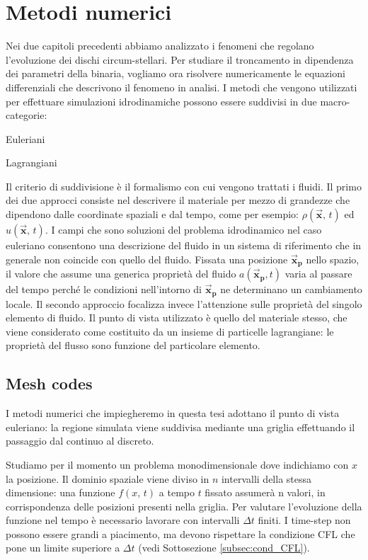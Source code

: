 \chapter{Metodi numerici}
Nei due capitoli precedenti abbiamo analizzato i fenomeni che regolano l'evoluzione dei dischi circum-stellari.
Per studiare il troncamento in dipendenza dei parametri della binaria, vogliamo ora risolvere numericamente le equazioni differenziali che descrivono il fenomeno in analisi. 
I metodi che vengono utilizzati per effettuare simulazioni idrodinamiche possono essere suddivisi in due macro-categorie:
\begin{list}{\textbf{-}}{\setlength{\itemsep}{0cm}}
    \item Euleriani
    \item Lagrangiani
\end{list}
Il criterio di suddivisione è il formalismo con cui vengono trattati i fluidi.
Il primo dei due approcci consiste nel descrivere il materiale per mezzo di grandezze che dipendono dalle coordinate spaziali e dal tempo, come per esempio: $\rho\left(\Vec{\textbf{x}},\,t\right)$ ed $u\left(\Vec{\textbf{x}},\,t\right)$.
I campi che sono soluzioni del problema idrodinamico nel caso euleriano consentono una descrizione del fluido in un sistema di riferimento che in generale non coincide con quello del fluido. Fissata una posizione $\Vec{\textbf{x}}_\textbf{p}$ nello spazio, il valore che assume una generica proprietà del fluido $a\left(\Vec{\textbf{x}}_\textbf{p}, t\right)$ varia al passare del tempo perché le condizioni nell'intorno di $\Vec{\textbf{x}}_\textbf{p}$ ne determinano un cambiamento locale. 
Il secondo approccio focalizza invece l'attenzione sulle proprietà del singolo elemento di fluido. Il punto di vista utilizzato è quello del materiale stesso, che viene considerato come costituito da un insieme di particelle lagrangiane: le proprietà del flusso sono funzione del particolare elemento.

\section{Mesh codes}

I metodi numerici che impiegheremo in questa tesi adottano il punto di vista euleriano: la regione simulata viene suddivisa mediante una griglia effettuando il passaggio dal continuo al discreto.

Studiamo per il momento un problema monodimensionale dove indichiamo con $x$ la posizione. Il dominio spaziale viene diviso in $n$ intervalli della stessa dimensione: una funzione $f(x,\,t)$ a tempo $t$ fissato assumerà n valori, in corrispondenza delle posizioni presenti nella griglia.
Per  valutare l'evoluzione della funzione nel tempo è necessario lavorare con intervalli $\Delta t$ finiti. I time-step non possono essere grandi a piacimento, ma devono rispettare la condizione CFL che pone un limite superiore a $\Delta t$ (vedi Sottosezione \ref{subsec:cond_CFL}).

